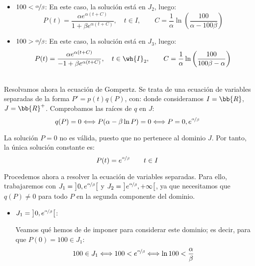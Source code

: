 \begin{ejercicio}
\begin{itemize}
        \item \ul{$100<\nicefrac{\alpha}{\beta}$}: En este caso, la solución está en $J_2$, luego:
        \begin{equation*}
            P(t) = \dfrac{\alpha e^{\alpha (t + C)}}{1+\beta e^{\alpha (t + C)}}, \quad t\in I, \qquad C=\dfrac{1}{\alpha}\ln\left(\dfrac{100}{\alpha - 100\beta}\right)
        \end{equation*}

        \item \ul{$100>\nicefrac{\alpha}{\beta}$}: En este caso, la solución está en $J_3$, luego:
        \begin{equation*}
            P(t) = \dfrac{\alpha e^{\alpha (t + C)}}{-1+\beta e^{\alpha (t + C)}}, \quad t\in \wh{I}_2, \qquad C=\dfrac{1}{\alpha}\ln\left(\dfrac{100}{100\beta-\alpha}\right)
        \end{equation*}
    \end{itemize}~\\

    Resolvamos ahora la ecuación de Gompertz. Se trata de una ecuación de variables separadas de la forma $P' = p(t)q(P)$, con:
    donde consideramos $I=\bb{R}$, $J=\bb{R}^+$. Comprobamos las raíces de $q$ en $J$:
    \begin{equation*}
        q(P) = 0 \Longleftrightarrow P(\alpha - \beta \ln P) = 0 \Longleftrightarrow P=0, e^{\nicefrac{\alpha}{\beta}}
    \end{equation*}

    La solución $P=0$ no es válida, puesto que no pertenece al dominio $J$. Por tanto, la única solución constante es:
    \begin{equation*}
        P(t) = e^{\nicefrac{\alpha}{\beta}} \qquad t\in I
    \end{equation*}

    Procedemos ahora a resolver la ecuación de variables separadas. Para ello, trabajaremos con $J_1=\left]0,e^{\nicefrac{\alpha}{\beta}}\right[$ y $J_2=\left]e^{\nicefrac{\alpha}{\beta}}, +\infty\right[$, ya que necesitamos que $q(P)\neq 0$ para todo $P$ en la segunda componente del dominio.
    \begin{itemize}
        \item \ul{$J_1=\left]0,e^{\nicefrac{\alpha}{\beta}}\right[$}:
        
        Veamos qué hemos de de imponer para considerar este dominio; es decir, para que $P(0)=100\in J_1$:
        \begin{equation*}
            100\in J_1 \Longleftrightarrow 100<e^{\nicefrac{\alpha}{\beta}} \Longleftrightarrow \ln 100 < \dfrac{\alpha}{\beta}
        \end{equation*}


\end{itemize}
\end{ejercicio}
